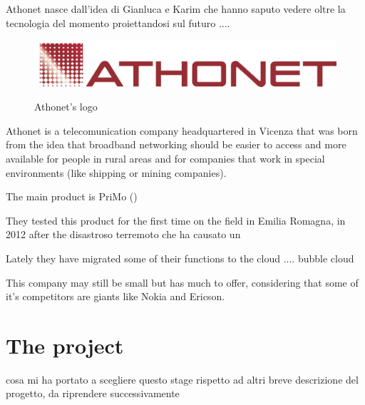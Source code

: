 	Athonet nasce dall'idea di Gianluca e Karim che hanno saputo vedere oltre la tecnologia del momento proiettandosi sul futuro ....
	
	\begin{figure}[H]
		\centering
		\includegraphics[width=.7\textwidth]{resources/ath_logo}\\
		\caption{Athonet's logo}
	\end{figure}
	
	Athonet is a telecomunication company headquartered in Vicenza that was born from the idea that broadband networking should be easier to access and more available for people in rural areas and for companies that work in special environments (like shipping or mining companies).
	
	The main product is PriMo ()
	
	They tested this product for the first time on the field in Emilia Romagna, in 2012 after the disastroso terremoto che ha causato un 
	
	Lately they have migrated some of their functions to the cloud .... bubble cloud
	
	This company may still be small but has much to offer, considering that some of it's competitors are giants like Nokia and Ericson.
	

\section{The project}
	cosa mi ha portato a scegliere questo stage rispetto ad altri
	breve descrizione del progetto, da riprendere successivamente

